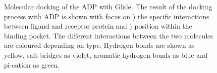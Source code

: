 \documentclass[11pt, letterpaper, titlepage]{article}
\begin{document}
\begin{figure}[htp]
	\centering
	\captionsetup[subfigure]{skip=-20pt,position=top,labelfont=bf,labelformat=parens,singlelinecheck=false}
	\caption{Molecular docking of the ADP with Glide. The result of the docking process with ADP is shown with focus on ) the specific interactions between ligand and receptor protein and ) position within the binding pocket. The different interactions between the two molecules are coloured depending on type. Hydrogen bonds are shown as yellow, salt bridges as violet, aromatic hydrogen bonds as blue and pi-cation as green.}\label{fig:docking_ADP}
\end{figure}
\end{document}
